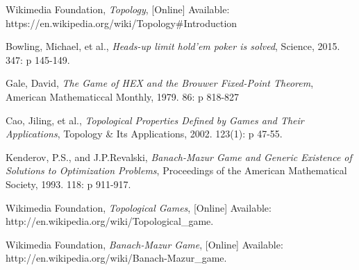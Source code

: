 \documentclass[11pt]{article}
\begin{document}
\newpage
\begin{thebibliography}{9}

  Wikimedia Foundation,
  \emph{Topology},
  [Online] Available:
  https://en.wikipedia.org/wiki/Topology\#Introduction

  Bowling, Michael, et al.,
  \emph{Heads-up limit hold'em poker is solved},
  Science,
  2015. 347: p 145-149.
  
  Gale, David,
  \emph{The Game of HEX and the Brouwer Fixed-Point Theorem},
  American Mathematiccal Monthly,
  1979. 86: p 818-827
	
  Cao, Jiling, et al.,
  \emph{Topological Properties Defined by Games and Their Applications},
  Topology \& Its Applications,
  2002. 123(1): p 47-55.
  
  Kenderov, P.S., and J.P.Revalski,
  \emph{Banach-Mazur Game and Generic Existence of Solutions to Optimization Problems},
  Proceedings of the American Mathematical Society,
  1993. 118: p 911-917.
  
  Wikimedia Foundation,
  \emph{Topological Games},
  [Online]
  Available: http://en.wikipedia.org/wiki/Topological\_game.

  Wikimedia Foundation,
  \emph{Banach-Mazur Game},
  [Online] Available:
  http://en.wikipedia.org/wiki/Banach-Mazur\_game.

	
\end{thebibliography}
\end{document}
